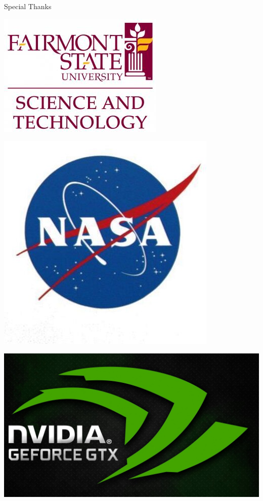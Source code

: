 \documentclass{beamer}
\begin{document}
\begin{frame}{Special Thanks}
\centering
\begin{minipage}{0.3\textwidth}
	\includegraphics[scale=0.3]{images/FSULogo.jpg}
\end{minipage} \quad
\begin{minipage}{0.3\textwidth}
	\includegraphics[scale=0.25]{images/NasaLogo.jpeg}
\end{minipage} \quad
\begin{minipage}{0.3\textwidth}
	\includegraphics[scale=0.1]{images/NVidiaLogo.jpg}
\end{minipage}
\end{frame}
\end{document}
